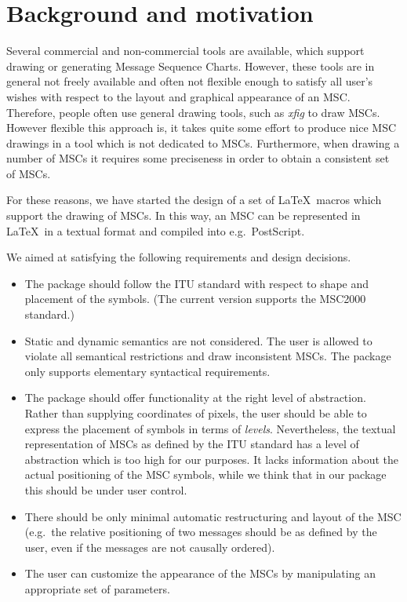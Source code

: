 \documentclass[12pt,a4paper]{article}
\newcommand{\acro}[1]{{#1}}
\newcommand{\MSC}{\acro{MSC}}
\begin{document}
\section{Background and motivation}
\label{background}
Several commercial and non-commercial tools are available, which
support drawing or generating Message Sequence Charts. However, these
tools are in general not freely available and often not flexible
enough to satisfy all user's wishes with respect to the layout and
graphical appearance of an \MSC{}.
Therefore, people often use general drawing tools, such as {\em xfig}
to draw \MSC{}s. However flexible this approach is, it takes quite some
effort to produce nice \MSC{} drawings in a tool which is not dedicated
to \MSC{}s. Furthermore, when drawing a number of \MSC{}s it requires some
preciseness in order to obtain a consistent set of \MSC{}s.

For these reasons, we have started the design of a set of
\LaTeX\ macros which support the drawing of \MSC{}s. In this way, an \MSC{} can be
represented in \LaTeX\ in a textual format and compiled into
e.g.\ PostScript.

We aimed at satisfying the following requirements and design
decisions.
\begin{itemize}
\item
The package should follow the ITU standard with respect to shape and
placement of the symbols. (The current version supports
the \MSC2000 standard.) 
\item
Static and dynamic semantics are not considered. The user is allowed
to violate all semantical restrictions and draw inconsistent \MSC{}s.
The package only supports elementary syntactical requirements.
\item
The package should offer functionality at the right level of
abstraction. Rather than supplying coordinates of pixels, the
user should be able to express the placement of symbols in terms of
{\em levels}.
Nevertheless, the textual representation of \MSC{}s as defined by the ITU
standard has a level of abstraction which is too high for our purposes.
It lacks information about the actual positioning of the \MSC{} symbols,
while we think that in our package this should be under user control.
\item
There should be only minimal automatic restructuring and layout of the
\MSC{} (e.g.\ the relative positioning of two messages should be as
defined by the user, even if the messages are not causally ordered).
\item
The user can customize the appearance of the \MSC{}s by manipulating
an appropriate set of parameters.
\end{itemize}
\end{document}
